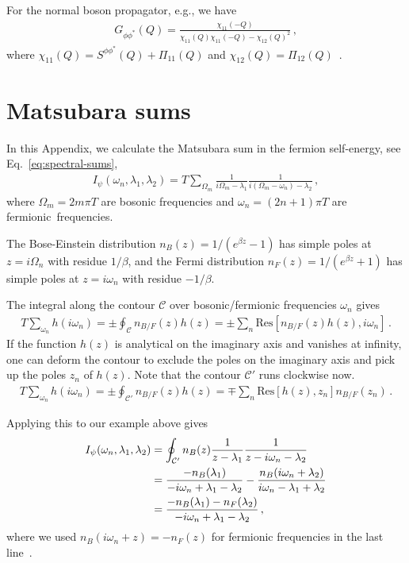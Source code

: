 For the normal boson propagator, e.g., we have~\cite{Perali2004}
\begin{align}
	G_{\phi\phi^*}(Q) = \frac{\chi_{11}(-Q)}{\chi_{11}(Q)\chi_{11}(-Q)-\chi_{12}(Q)^2} \,,
\end{align}
where $\chi_{11}(Q) = S^{\phi\phi^*}(Q) + \Pi_{11}(Q)$ and $\chi_{12}(Q) = \Pi_{12}(Q)$~\cite{Pieri2004-1}.


\clearpage

\section{Matsubara sums}
\label{app:matsubara-sums}

In this Appendix, we calculate the Matsubara sum in the fermion self-energy, see Eq.~\eqref{eq:spectral-sums},
\begin{align}
	I_{\psi}(\omega_n,\lambda_1,\lambda_2)
	= T \sum_{\Omega_m}
	\frac{1}{i\Omega_m-\lambda_1}
    \frac{1}{i(\Omega_m-\omega_n)-\lambda_2} \,,
\end{align}
where $\Omega_m=2m\pi T$ are bosonic frequencies and $\omega_n=(2n+1)\pi T$
are fermionic~\mbox{frequencies}.

The Bose-Einstein distribution $n_B(z)=1/(e^{\beta z}-1)$ has simple
poles at $z=i\Omega_n$ with residue $1/\beta$, and the Fermi distribution
$n_F(z)=1/(e^{\beta z}+1)$ has simple poles at $z=i\omega_n$ with residue
$-1/\beta$.

The integral along the contour $\mathcal{C}$ over bosonic/fermionic
frequencies $\omega_n$ gives~\cite{Punk2010}
\begin{align}
	T \sum_{\omega_n} h(i\omega_n) =
	\pm \oint_{\mathcal{C}} n_{B/F}(z) h(z) =
	\pm \sum_n
	\mathrm{Res}[n_{B/F}(z) h(z), i\omega_n] \,.
\end{align}
If the function $h(z)$ is analytical on the imaginary axis and vanishes
at infinity, one can deform the contour to exclude the poles on the
imaginary axis and pick up the poles $z_n$ of $h(z)$. Note that the contour
$\mathcal{C}'$ runs clockwise now.
\begin{align}
	T \sum_{\omega_n} h(i\omega_n) =
	\pm \oint_{\mathcal{C}'} n_{B/F}(z) h(z) =
	\mp \sum_n \mathrm{Res}[h(z), z_n] n_{B/F}(z_n) \,.
\end{align}

Applying this to our example above gives
\begin{align}
	I_{\psi}(\omega_n,\lambda_1,\lambda_2)
	&= \oint_{\mathcal{C}'} n_B(z)
	\frac{1}{z-\lambda_1}
    \frac{1}{z-i\omega_n-\lambda_2} \notag \\
    &= \frac{-n_B(\lambda_1)}{-i\omega_n+\lambda_1-\lambda_2} -
    \frac{n_B(i\omega_n+\lambda_2)}{i\omega_n-\lambda_1+\lambda_2} \notag \\
    &= \frac{-n_B(\lambda_1)-n_F(\lambda_2)}{-i\omega_n+\lambda_1-\lambda_2} \,,
\end{align}
where we used $n_B(i\omega_n+z)=-n_F(z)$ for fermionic frequencies in the last line~\cite{Punk2010}.

